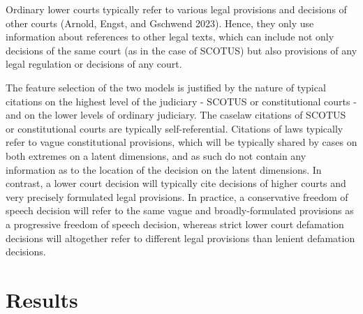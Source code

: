 \documentclass[
  11pt,
]{article}
\begin{document}
Ordinary lower courts typically refer to various legal provisions and
decisions of other courts (Arnold, Engst, and Gschwend 2023). Hence,
they only use information about references to other legal texts, which
can include not only decisions of the same court (as in the case of
SCOTUS) but also provisions of any legal regulation or decisions of any
court.

The feature selection of the two models is justified by the nature of
typical citations on the highest level of the judiciary - SCOTUS or
constitutional courts - and on the lower levels of ordinary judiciary.
The caselaw citations of SCOTUS or constitutional courts are typically
self-referential. Citations of laws typically refer to vague
constitutional provisions, which will be typically shared by cases on
both extremes on a latent dimensions, and as such do not contain any
information as to the location of the decision on the latent dimensions.
In contrast, a lower court decision will typically cite decisions of
higher courts and very precisely formulated legal provisions. In
practice, a conservative freedom of speech decision will refer to the
same vague and broadly-formulated provisions as a progressive freedom of
speech decision, whereas strict lower court defamation decisions will
altogether refer to different legal provisions than lenient defamation
decisions.

\section*{Results}\label{results}
\end{document}
